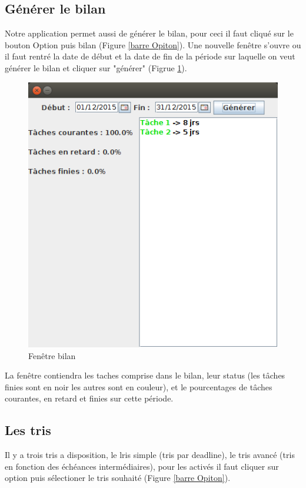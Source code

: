 \documentclass{article}
\begin{document}
\subsection{Générer le bilan}

Notre application permet aussi de générer le bilan, pour ceci il faut cliqué sur le bouton Option puis bilan (Figure \ref{barre Opiton}).
Une nouvelle fenêtre s'ouvre ou il faut rentré la date de début et la date de fin de la période sur laquelle on veut générer le bilan et cliquer sur "générer" (Figrue \ref{bilan}).

\begin{figure}
	\centering
	\includegraphics[scale=0.4]{images/CaptureDisplayBilan.png}
	\caption{Fenêtre bilan}
	\label{bilan}
\end{figure}

La fenêtre contiendra les taches comprise dans le bilan, leur status (les tâches finies sont en noir les autres sont en couleur), et le pourcentages de tâches courantes, en retard et finies sur cette période.

\subsection{Les tris}

Il y a trois tris a disposition, le lris simple (tris par deadline), le tris avancé (tris en fonction des échéances intermédiaires), pour les activés il faut cliquer sur option puis sélectioner le tris souhaité (Figure \ref{barre Opiton}).
\end{document}
